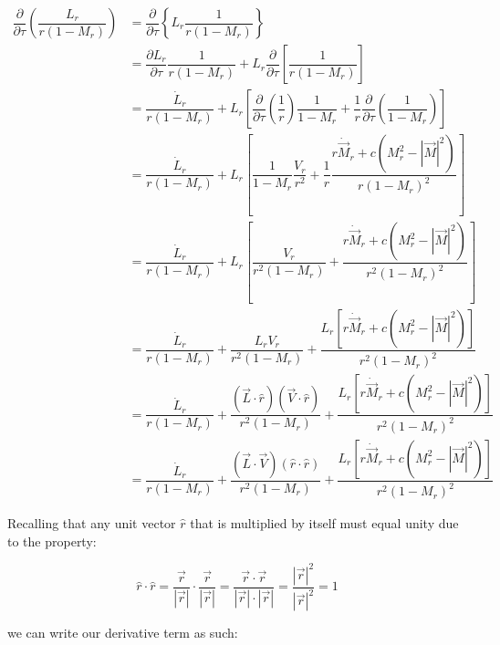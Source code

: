 \documentclass[]{aiaa-tc}%
\begin{document}
\begin{align*}
\dfrac{\partial}{\partial \tau} \left( \dfrac{L_r}{r (1 - M_r)}  \right)
& = \dfrac{\partial}{\partial \tau} \left\{ L_r \dfrac{1}{r (1 - M_r)}  \right\} \\
& = \dfrac{\partial L_r}{\partial \tau} \dfrac{1}{r (1 - M_r)}
    + L_r\dfrac{\partial}{\partial \tau} \left[ \dfrac{1}{r (1 - M_r)} \right] \\
& = \dfrac{\dot{L}_r}{r (1 - M_r)}
    + L_r \left[
    \dfrac{\partial}{\partial\tau} \left(\dfrac{1}{r}\right) \dfrac{1}{1 - M_r}
    + \dfrac{1}{r} \dfrac{\partial}{\partial\tau} \left(\dfrac{1}{1-M_r}\right)
    \right] \\
& = \dfrac{\dot{L}_r}{r (1 - M_r)}
    + L_r \left[
    \dfrac{1}{1 - M_r} \dfrac{V_r}{r^2}
    + \dfrac{1}{r}
    \dfrac{ r\dot{\vec{M}}_r + c \left( M_r^2 - |\vec{M}|^2 \right) }
    {r (1 - M_r)^2}
    \right] \\
& = \dfrac{\dot{L}_r}{r (1 - M_r)}
    + L_r \left[
    \dfrac{V_r}{r^2 (1 - M_r)}
    + \dfrac{ r\dot{\vec{M}}_r + c \left( M_r^2 - |\vec{M}|^2 \right) }
        {r^2 (1 - M_r)^2}
    \right] \\
&= \dfrac{\dot{L}_r}{r (1 - M_r)}
    + \dfrac{L_r V_r}{r^2 (1 - M_r)}
    + \dfrac{ L_r \left[
        r\dot{\vec{M}}_r + c \left( M_r^2 - |\vec{M}|^2 \right) \right] }
        {r^2 (1 - M_r)^2} \\
&= \dfrac{\dot{L}_r}{r (1 - M_r)}
    + \dfrac{(\vec{L}\cdot\hat{r}) (\vec{V}\cdot\hat{r})}{r^2 (1 - M_r)}
    + \dfrac{ L_r \left[
        r\dot{\vec{M}}_r + c \left( M_r^2 - |\vec{M}|^2 \right) \right] }
        {r^2 (1 - M_r)^2} \\
&= \dfrac{\dot{L}_r}{r (1 - M_r)}
    + \dfrac{(\vec{L}\cdot\vec{V}) (\hat{r}\cdot\hat{r})}{r^2 (1 - M_r)}
    + \dfrac{ L_r \left[
        r\dot{\vec{M}}_r + c \left( M_r^2 - |\vec{M}|^2 \right) \right] }
        {r^2 (1 - M_r)^2}
\end{align*}

\noindent Recalling that any unit vector $\hat{r}$ that is multiplied by itself must equal unity due to the property:

\begin{equation} \label{UnitSquared}
\hat{r}\cdot\hat{r}
= \dfrac{\vec{r}}{|\vec{r}|}\cdot\dfrac{\vec{r}}{|\vec{r}|}
= \dfrac{\vec{r}\cdot\vec{r}}{|\vec{r}|\cdot|\vec{r}|}
= \dfrac{|\vec{r}|^2}{|\vec{r}|^2} = 1
\end{equation}

\noindent we can write our derivative term as such:
\end{document}
